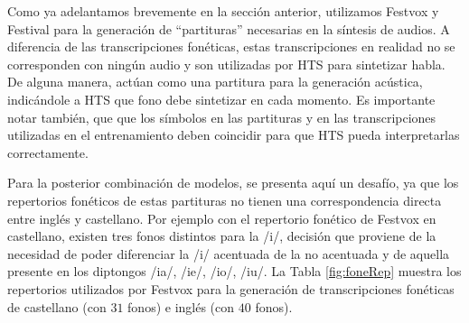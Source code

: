 
Como ya adelantamos brevemente en la sección anterior, utilizamos Festvox y Festival para la generación de ``partituras'' necesarias en la síntesis de audios. A diferencia de las transcripciones fonéticas, estas transcripciones en realidad no se corresponden con ningún audio y son utilizadas por HTS para sintetizar habla. De alguna manera, actúan como una partitura para la generación acústica, indicándole a HTS que fono debe sintetizar en cada momento. Es importante notar también, que que los símbolos en las partituras y en las transcripciones utilizadas en el entrenamiento deben coincidir para que HTS pueda interpretarlas correctamente.  

Para la posterior combinación de modelos, se presenta aquí un desafío, ya que los repertorios fonéticos de estas partituras no tienen una correspondencia directa entre inglés y castellano. Por ejemplo con el repertorio fonético de Festvox en castellano, existen tres fonos distintos para la /i/, decisión que proviene de la necesidad de poder diferenciar la /i/ acentuada de la no acentuada  y de aquella presente en los diptongos /ia/, /ie/, /io/, /iu/. La Tabla \ref{fig:foneRep} muestra los repertorios utilizados por Festvox para la generación de transcripciones fonéticas de castellano (con $31$ fonos) e inglés (con $40$ fonos).

